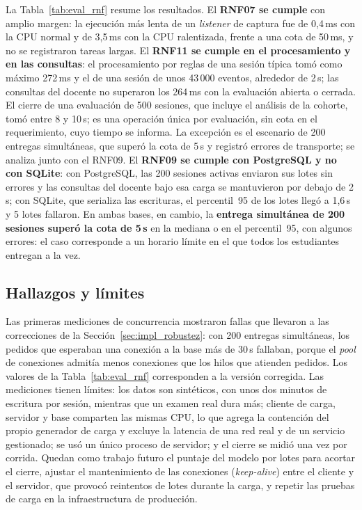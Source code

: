 La Tabla~\ref{tab:eval_rnf} resume los resultados. El \textbf{RNF07 se cumple} con amplio margen: la ejecución más lenta de un \textit{listener} de captura fue de 0,4\,ms con la CPU normal y de 3,5\,ms con la CPU ralentizada, frente a una cota de 50\,ms, y no se registraron tareas largas. El \textbf{RNF11 se cumple en el procesamiento y en las consultas}: el procesamiento por reglas de una sesión típica tomó como máximo 272\,ms y el de una sesión de unos 43\,000 eventos, alrededor de 2\,s; las consultas del docente no superaron los 264\,ms con la evaluación abierta o cerrada. El cierre de una evaluación de 500 sesiones, que incluye el análisis de la cohorte, tomó entre 8 y 10\,s; es una operación única por evaluación, sin cota en el requerimiento, cuyo tiempo se informa. La excepción es el escenario de 200 entregas simultáneas, que superó la cota de 5\,s y registró errores de transporte; se analiza junto con el RNF09. El \textbf{RNF09 se cumple con PostgreSQL y no con SQLite}: con PostgreSQL, las 200 sesiones activas enviaron sus lotes sin errores y las consultas del docente bajo esa carga se mantuvieron por debajo de 2\,s; con SQLite, que serializa las escrituras, el percentil~95 de los lotes llegó a 1,6\,s y 5 lotes fallaron. En ambas bases, en cambio, la \textbf{entrega simultánea de 200 sesiones superó la cota de 5\,s} en la mediana o en el percentil~95, con algunos errores: el caso corresponde a un horario límite en el que todos los estudiantes entregan a la vez.

\subsection{Hallazgos y límites}

Las primeras mediciones de concurrencia mostraron fallas que llevaron a las correcciones de la Sección~\ref{sec:impl_robustez}: con 200 entregas simultáneas, los pedidos que esperaban una conexión a la base más de 30\,s fallaban, porque el \textit{pool} de conexiones admitía menos conexiones que los hilos que atienden pedidos. Los valores de la Tabla~\ref{tab:eval_rnf} corresponden a la versión corregida. Las mediciones tienen límites: los datos son sintéticos, con unos dos minutos de escritura por sesión, mientras que un examen real dura más; cliente de carga, servidor y base comparten las mismas CPU, lo que agrega la contención del propio generador de carga y excluye la latencia de una red real y de un servicio gestionado; se usó un único proceso de servidor; y el cierre se midió una vez por corrida. Quedan como trabajo futuro el puntaje del modelo por lotes para acortar el cierre, ajustar el mantenimiento de las conexiones (\textit{keep-alive}) entre el cliente y el servidor, que provocó reintentos de lotes durante la carga, y repetir las pruebas de carga en la infraestructura de producción.

